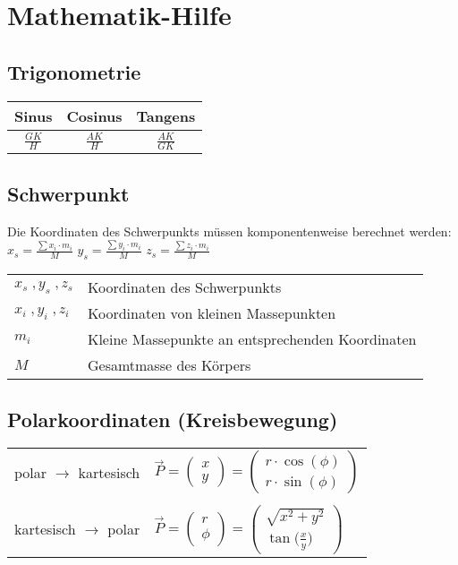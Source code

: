 \section{Mathematik-Hilfe}
		
	\subsection{Trigonometrie}
	\begin{tabular}{| c | c | c |}
	\hline
	Sinus & Cosinus & Tangens \\ 
	\hline 
	\rule{0pt}{10pt} $\frac{GK}{H}$ & $\frac{AK}{H}$ & $\frac{AK}{GK}$ \\ 
	\hline
	\end{tabular} 
		
		
		
	\subsection{Schwerpunkt}
	Die Koordinaten des Schwerpunkts müssen komponentenweise berechnet werden: \\

	$x_s = \frac{\sum  x_i \cdot m_i}{M}$ \qquad	$y_s = \frac{\sum  y_i \cdot m_i}{M}$ \qquad $z_s = \frac{\sum  z_i \cdot m_i}{M}$ \\

	\begin{tabular}{ll}
	$x_s \; , y_s \; , z_s$ & Koordinaten des Schwerpunkts \\
	$x_i \; , y_i \; , z_i$ & Koordinaten von kleinen Massepunkten \\
	$m_i$ & Kleine Massepunkte an entsprechenden Koordinaten \\
	$M$ & Gesamtmasse des Körpers
	\end{tabular}
	
	\subsection{Polarkoordinaten (Kreisbewegung)}

	
	\begin{tabular}{ll}
	polar $\rightarrow$ kartesisch & $\vec{P} =  \begin{pmatrix} x \\ y \end{pmatrix} =  \begin{pmatrix} r \cdot \cos(\phi)  \\ r \cdot \sin(\phi)  \end{pmatrix}$ \\
	\\
	kartesisch $\rightarrow$ polar & $\vec{P} =  \begin{pmatrix} r \\ \phi \end{pmatrix} =  \begin{pmatrix} \sqrt{x^2 + y^2}  \\ \tan \big( \frac{x}{y} \big)   \end{pmatrix}$\\
	\end{tabular}
	
